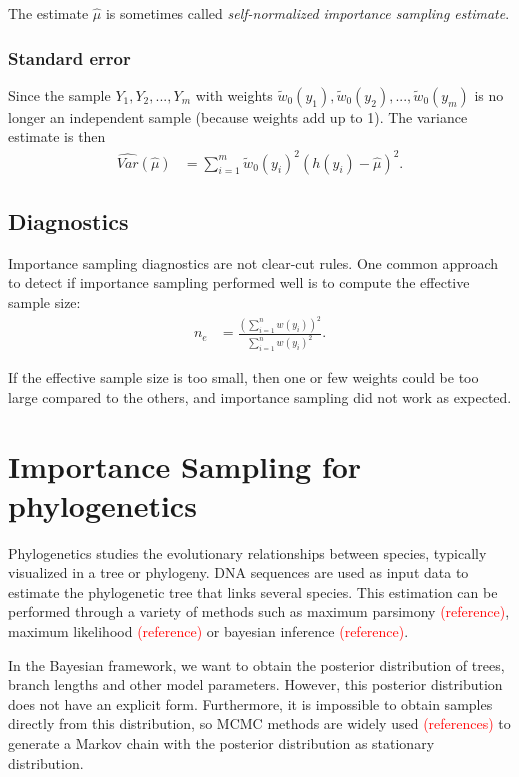 \documentclass[conference]{IEEEtran}
\newcommand{\falta}[1]{\textcolor{red}{#1}}
\begin{document}
The estimate $\hat{\mu}$ is sometimes called
\textit{self-normalized importance sampling estimate}.

\subsubsection*{Standard error}
Since the sample $Y_1,Y_2,...,Y_m$ with weights
$\tilde{w}_0(y_1),\tilde{w}_0(y_2),...,\tilde{w}_0(y_m)$ is no longer
an independent sample (because weights add up to 1). The variance
estimate is then \citep{Owen2013}
\begin{align*}
\widehat{Var}(\hat{\mu}) &= \sum_{i=1}^m \tilde{w}_0(y_i)^2(h(y_i)-\hat{\mu})^2.
\end{align*}

\subsection*{Diagnostics}
Importance sampling diagnostics are not clear-cut rules. One common
approach to detect if importance sampling performed well is to compute
the effective sample size:
\begin{align*}
n_e &= \frac{\left( \sum_{i=1}^n w(y_i) \right)^2}{\sum_{i=1}^nw(y_i)^2}.
\end{align*}

If the effective sample size is too small, then one or few weights
could be too large compared to the others, and importance sampling did
not work as expected.

\section{Importance Sampling for phylogenetics}
Phylogenetics studies the evolutionary relationships between species,
typically visualized in a tree or phylogeny. DNA sequences are used as
input data to estimate the phylogenetic tree that links several
species. This estimation can be performed through a variety of methods
such as maximum parsimony \falta{(reference)}, maximum likelihood
\falta{(reference)} or bayesian inference \falta{(reference)}.

In the Bayesian framework, we want to obtain the posterior
distribution of trees, branch lengths and other model
parameters. However, this posterior distribution does not have an
explicit form. Furthermore, it is impossible to obtain samples
directly from this distribution, so MCMC methods are widely used
\falta{(references)} to generate a Markov chain with the posterior
distribution as stationary distribution.
\end{document}
